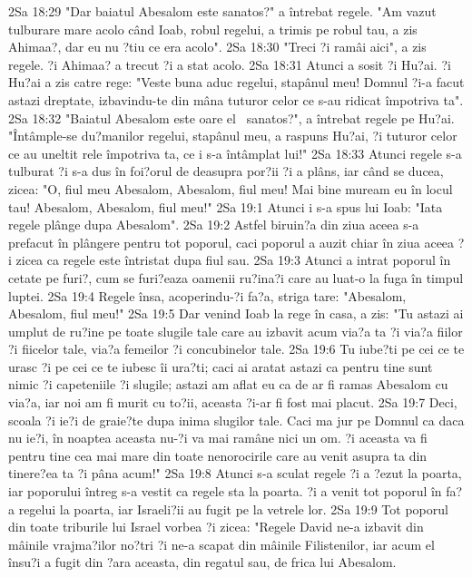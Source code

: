 2Sa 18:29  "Dar baiatul Abesalom este sanatos?" a întrebat regele. "Am vazut tulburare mare acolo când Ioab, robul regelui, a trimis pe robul tau, a zis Ahimaa?, dar eu nu ?tiu ce era acolo".
2Sa 18:30  "Treci ?i ramâi aici", a zis regele. ?i Ahimaa? a trecut ?i a stat acolo.
2Sa 18:31  Atunci a sosit ?i Hu?ai. ?i Hu?ai a zis catre rege: "Veste buna aduc regelui, stapânul meu! Domnul ?i-a facut astazi dreptate, izbavindu-te din mâna tuturor celor ce s-au ridicat împotriva ta".
2Sa 18:32  "Baiatul Abesalom este oare el  sanatos?", a întrebat regele pe Hu?ai. "Întâmple-se du?manilor regelui, stapânul meu, a raspuns Hu?ai, ?i tuturor celor ce au uneltit rele împotriva ta, ce i s-a întâmplat lui!"
2Sa 18:33  Atunci regele s-a tulburat ?i s-a dus în foi?orul de deasupra por?ii ?i a plâns, iar când se ducea, zicea: "O, fiul meu Abesalom, Abesalom, fiul meu! Mai bine muream eu în locul tau! Abesalom, Abesalom, fiul meu!"
2Sa 19:1  Atunci i s-a spus lui Ioab: "Iata regele plânge dupa Abesalom".
2Sa 19:2  Astfel biruin?a din ziua aceea s-a prefacut în plângere pentru tot poporul, caci poporul a auzit chiar în ziua aceea ?i zicea ca regele este întristat dupa fiul sau.
2Sa 19:3  Atunci a intrat poporul în cetate pe furi?, cum se furi?eaza oamenii ru?ina?i care au luat-o la fuga în timpul luptei.
2Sa 19:4  Regele însa, acoperindu-?i fa?a, striga tare: "Abesalom, Abesalom, fiul meu!"
2Sa 19:5  Dar venind Ioab la rege în casa, a zis: "Tu astazi ai umplut de ru?ine pe toate slugile tale care au izbavit acum via?a ta ?i via?a fiilor ?i fiicelor tale, via?a femeilor ?i concubinelor tale.
2Sa 19:6  Tu iube?ti pe cei ce te urasc ?i pe cei ce te iubesc îi ura?ti; caci ai aratat astazi ca pentru tine sunt nimic ?i capeteniile ?i slugile; astazi am aflat eu ca de ar fi ramas Abesalom cu via?a, iar noi am fi murit cu to?ii, aceasta ?i-ar fi fost mai placut.
2Sa 19:7  Deci, scoala ?i ie?i de graie?te dupa inima slugilor tale. Caci ma jur pe Domnul ca daca nu ie?i, în noaptea aceasta nu-?i va mai ramâne nici un om. ?i aceasta va fi pentru tine cea mai mare din toate nenorocirile care au venit asupra ta din tinere?ea ta ?i pâna acum!"
2Sa 19:8  Atunci s-a sculat regele ?i a ?ezut la poarta, iar poporului întreg s-a vestit ca regele sta la poarta. ?i a venit tot poporul în fa?a regelui la poarta, iar Israeli?ii au fugit pe la vetrele lor.
2Sa 19:9  Tot poporul din toate triburile lui Israel vorbea ?i zicea: "Regele David ne-a izbavit din mâinile vrajma?ilor no?tri ?i ne-a scapat din mâinile Filistenilor, iar acum el însu?i a fugit din ?ara aceasta, din regatul sau, de frica lui Abesalom.
